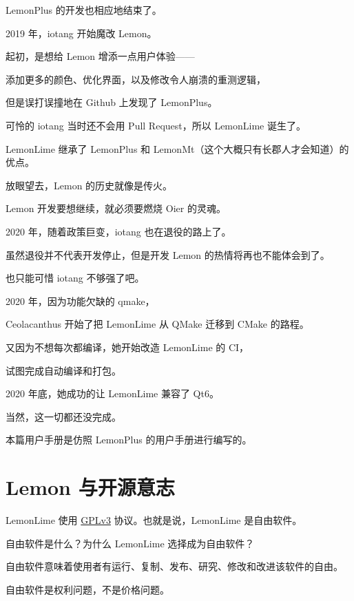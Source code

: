 \documentclass[UTF-8]{ctexart}
\begin{document}
		LemonPlus 的开发也相应地结束了。\newline

		2019 年，iotang 开始魔改 Lemon。

		起初，是想给 Lemon 增添一点用户体验——

		添加更多的颜色、优化界面，以及修改令人崩溃的重测逻辑，

		但是误打误撞地在 Github 上发现了 LemonPlus。

		可怜的 iotang 当时还不会用 Pull Request，所以 LemonLime 诞生了。

		LemonLime 继承了 LemonPlus 和 LemonMt（这个大概只有长郡人才会知道）的优点。\newline

		放眼望去，Lemon 的历史就像是传火。

		Lemon 开发要想继续，就必须要燃烧 Oier 的灵魂。

		2020 年，随着政策巨变，iotang 也在退役的路上了。

		虽然退役并不代表开发停止，但是开发 Lemon 的热情将再也不能体会到了。

		也只能可惜 iotang 不够强了吧。\newline

		2020 年，因为功能欠缺的 qmake，

		Ceolacanthus 开始了把 LemonLime 从 QMake 迁移到 CMake 的路程。

		又因为不想每次都编译，她开始改造 LemonLime 的 CI，

		试图完成自动编译和打包。

		2020 年底，她成功的让 LemonLime 兼容了 Qt6。

		当然，这一切都还没完成。\newline

		本篇用户手册是仿照 LemonPlus 的用户手册进行编写的。

	\newpage

	\section{Lemon 与开源意志}

		LemonLime 使用 \href{https://www.gnu.org/licenses/gpl-3.0.html}{GPLv3} 协议。也就是说，LemonLime 是自由软件。\newline

		自由软件是什么？为什么 LemonLime 选择成为自由软件？

		自由软件意味着使用者有运行、复制、发布、研究、修改和改进该软件的自由。

		自由软件是权利问题，不是价格问题。
\end{document}
